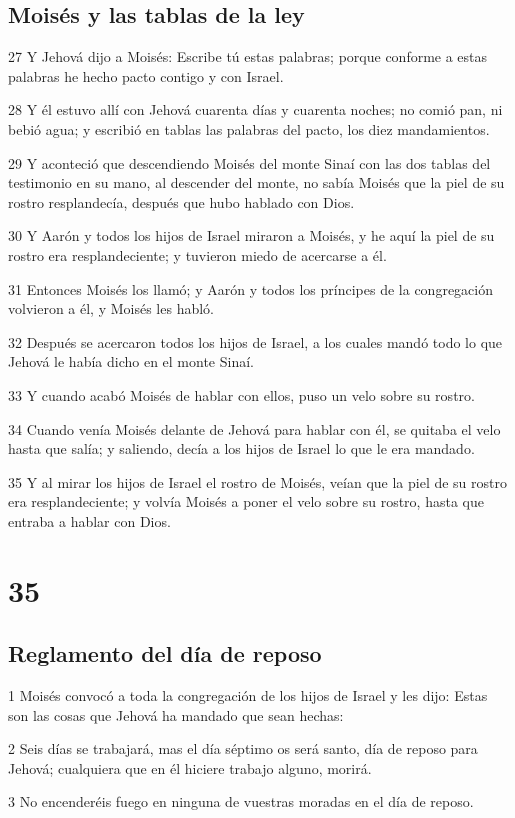 \section*{Moisés y las tablas de la ley}

\par 27 Y Jehová dijo a Moisés: Escribe tú estas palabras; porque conforme a estas palabras he hecho pacto contigo y con Israel.
\par 28 Y él estuvo allí con Jehová cuarenta días y cuarenta noches; no comió pan, ni bebió agua; y escribió en tablas las palabras del pacto, los diez mandamientos.
\par 29 Y aconteció que descendiendo Moisés del monte Sinaí con las dos tablas del testimonio en su mano, al descender del monte, no sabía Moisés que la piel de su rostro resplandecía, después que hubo hablado con Dios.
\par 30 Y Aarón y todos los hijos de Israel miraron a Moisés, y he aquí la piel de su rostro era resplandeciente; y tuvieron miedo de acercarse a él.
\par 31 Entonces Moisés los llamó; y Aarón y todos los príncipes de la congregación volvieron a él, y Moisés les habló.
\par 32 Después se acercaron todos los hijos de Israel, a los cuales mandó todo lo que Jehová le había dicho en el monte Sinaí.
\par 33 Y cuando acabó Moisés de hablar con ellos, puso un velo sobre su rostro.
\par 34 Cuando venía Moisés delante de Jehová para hablar con él, se quitaba el velo hasta que salía; y saliendo, decía a los hijos de Israel lo que le era mandado.
\par 35 Y al mirar los hijos de Israel el rostro de Moisés, veían que la piel de su rostro era resplandeciente; y volvía Moisés a poner el velo sobre su rostro, hasta que entraba a hablar con Dios.

\chapter{35}

\section*{Reglamento del día de reposo}

\par 1 Moisés convocó a toda la congregación de los hijos de Israel y les dijo: Estas son las cosas que Jehová ha mandado que sean hechas:
\par 2 Seis días se trabajará, mas el día séptimo os será santo, día de reposo para Jehová; cualquiera que en él hiciere trabajo alguno, morirá.
\par 3 No encenderéis fuego en ninguna de vuestras moradas en el día de reposo.

